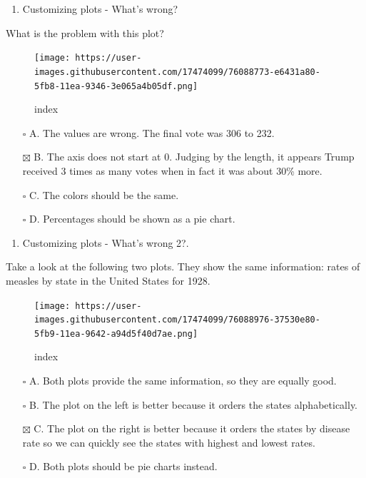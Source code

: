 \documentclass[
]{article}
\providecommand{\tightlist}{%
  \setlength{\itemsep}{0pt}\setlength{\parskip}{0pt}}
\begin{document}
\begin{enumerate}
\def\labelenumi{\arabic{enumi}.}
\setcounter{enumi}{1}
\tightlist
\item
  Customizing plots - What's wrong?
\end{enumerate}

What is the problem with this plot?

\begin{figure}
\centering
\texttt{[image: https://user-images.githubusercontent.com/17474099/76088773-e6431a80-5fb8-11ea-9346-3e065a4b05df.png]}
\caption{index}
\end{figure}

\begin{itemize}
\tightlist
\item[$\square$]
  A. The values are wrong. The final vote was 306 to 232.
\item[$\boxtimes$]
  B. The axis does not start at 0. Judging by the length, it appears
  Trump received 3 times as many votes when in fact it was about 30\%
  more.
\item[$\square$]
  C. The colors should be the same.
\item[$\square$]
  D. Percentages should be shown as a pie chart.
\end{itemize}

\begin{enumerate}
\def\labelenumi{\arabic{enumi}.}
\setcounter{enumi}{2}
\tightlist
\item
  Customizing plots - What's wrong 2?.
\end{enumerate}

Take a look at the following two plots. They show the same information:
rates of measles by state in the United States for 1928.

\begin{figure}
\centering
\texttt{[image: https://user-images.githubusercontent.com/17474099/76088976-37530e80-5fb9-11ea-9642-a94d5f40d7ae.png]}
\caption{index}
\end{figure}

\begin{itemize}
\tightlist
\item[$\square$]
  A. Both plots provide the same information, so they are equally good.
\item[$\square$]
  B. The plot on the left is better because it orders the states
  alphabetically.
\item[$\boxtimes$]
  C. The plot on the right is better because it orders the states by
  disease rate so we can quickly see the states with highest and lowest
  rates.
\item[$\square$]
  D. Both plots should be pie charts instead.
\end{itemize}
\end{document}
